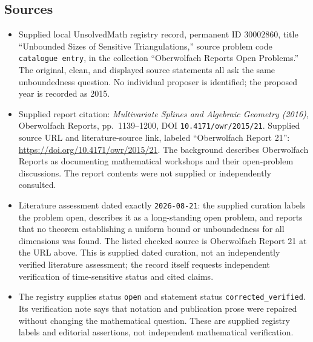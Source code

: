 \documentclass[11pt]{article}
\begin{document}
\subsection{Sources}
\begin{itemize}
\item Supplied local UnsolvedMath registry record, permanent ID \(30002860\), title ``Unbounded Sizes of Sensitive Triangulations,'' source problem code \texttt{catalogue entry}, in the collection ``Oberwolfach Reports Open Problems.'' The original, clean, and displayed source statements all ask the same unboundedness question. No individual proposer is identified; the proposed year is recorded as 2015.
\item Supplied report citation: \emph{Multivariate Splines and Algebraic Geometry (2016)}, Oberwolfach Reports, pp.\ 1139--1200, DOI \texttt{10.4171/owr/2015/21}. Supplied source URL and literature-source link, labeled ``Oberwolfach Report 21'': \url{https://doi.org/10.4171/owr/2015/21}. The background describes Oberwolfach Reports as documenting mathematical workshops and their open-problem discussions. The report contents were not supplied or independently consulted.
\item Literature assessment dated exactly \texttt{2026-08-21}: the supplied curation labels the problem open, describes it as a long-standing open problem, and reports that no theorem establishing a uniform bound or unboundedness for all dimensions was found. The listed checked source is Oberwolfach Report 21 at the URL above. This is supplied dated curation, not an independently verified literature assessment; the record itself requests independent verification of time-sensitive status and cited claims.
\item The registry supplies status \texttt{open} and statement status \texttt{corrected\_verified}. Its verification note says that notation and publication prose were repaired without changing the mathematical question. These are supplied registry labels and editorial assertions, not independent mathematical verification.
\end{itemize}
\end{document}
